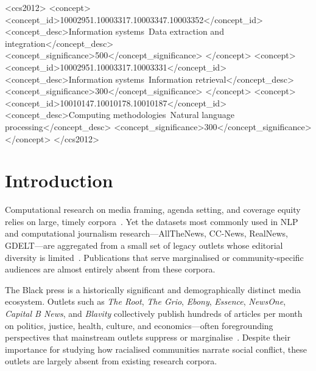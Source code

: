 \documentclass[sigconf,anonymous]{acmart}
\begin{document}
\begin{CCSXML}
<ccs2012>
   <concept>
       <concept_id>10002951.10003317.10003347.10003352</concept_id>
       <concept_desc>Information systems~Data extraction and integration</concept_desc>
       <concept_significance>500</concept_significance>
   </concept>
   <concept>
       <concept_id>10002951.10003317.10003331</concept_id>
       <concept_desc>Information systems~Information retrieval</concept_desc>
       <concept_significance>300</concept_significance>
   </concept>
   <concept>
       <concept_id>10010147.10010178.10010187</concept_id>
       <concept_desc>Computing methodologies~Natural language processing</concept_desc>
       <concept_significance>300</concept_significance>
   </concept>
</ccs2012>
\end{CCSXML}



\maketitle

\section{Introduction}

Computational research on media framing, agenda setting, and coverage equity
relies on large, timely corpora~\cite{boumans2016taking,boukes2023capturing}.
Yet the datasets most commonly used in NLP and computational journalism
research---AllTheNews, CC-News, RealNews, GDELT---are aggregated from a small
set of legacy outlets whose editorial diversity is
limited~\cite{raleigh2023political}.
Publications that serve marginalised or community-specific audiences are almost
entirely absent from these corpora.

The Black press is a historically significant and demographically distinct media
ecosystem.
Outlets such as \emph{The Root}, \emph{The Grio}, \emph{Ebony}, \emph{Essence},
\emph{NewsOne}, \emph{Capital B News}, and \emph{Blavity} collectively publish
hundreds of articles per month on politics, justice, health, culture, and
economics---often foregrounding perspectives that mainstream outlets suppress or
marginalise~\cite{gallon2021black,mellinger2020parallel}.
Despite their importance for studying how racialised communities narrate social
conflict, these outlets are largely absent from existing research corpora.
\end{document}
